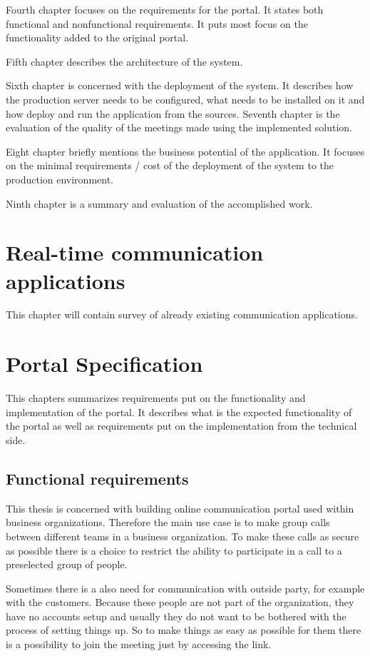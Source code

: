 \documentclass[
  digital, %
  table,   %
  lof,     %
  nolot,     %
]{fithesis3}
\begin{document}
Fourth chapter focuses on the requirements for the portal. It states both functional and nonfunctional requirements. It puts most focus on the functionality added to the original portal.

Fifth chapter describes the architecture of the system.

Sixth chapter is concerned with the deployment of the system. It describes how the production server needs to be configured, what needs to be installed on it and how deploy and run the application from the sources.
Seventh chapter is the evaluation of the quality of the meetings made using the implemented solution.

Eight chapter briefly mentions the business potential of the application. It focuses on the minimal requirements / cost of the deployment of the system to the production environment.

Ninth chapter is a summary and evaluation of the accomplished work.

\chapter{Real-time communication applications}
This chapter will contain survey of already existing communication applications.

\chapter{Portal Specification}
This chapters summarizes requirements put on the functionality and implementation of the portal. It describes what is the expected functionality of the portal as well as requirements put on the implementation from the technical side.

\section{Functional requirements}
This thesis is concerned with building online communication portal used within business organizations. Therefore the main use case is to make group calls between different teams in a business organization. To make these calls as secure as possible there is a choice to restrict the ability to participate in a call to a preselected group of people.

Sometimes there is a also need for communication with outside party, for example with the customers. Because these people are not part of the organization, they have no accounts setup and usually they do not want to be bothered with the process of setting things up. So to make things as easy as possible for them there is a possibility to join the meeting just by accessing the link. 
\end{document}
